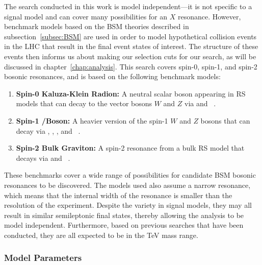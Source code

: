 The search conducted in this work is model independent---it is not specific to a signal model and can cover many possibilities for an $X$ resonance.
However, benchmark models based on the BSM theories described in subsection~\ref{subsec:BSM} are used in order to model hypothetical collision events in the LHC that result in the final event states of interest.
The structure of these events then informs us about making our selection cuts for our search, as will be discussed in chapter~\ref{chap:analysis}.
This search covers spin-0, spin-1, and spin-2 bosonic resonances, and is based on the following benchmark models:
\begin{enumerate}
  \item \textbf{Spin-0 Kaluza-Klein Radion:} A neutral scalar boson appearing in RS models that can decay to the vector bosons $W$ and $Z$ via \RadtoWW and \RadtoZZ~\cite{Goldberger_1999,Goldberger_2000}.
  \item \textbf{Spin-1 \Wpr/\Zpr Boson:} A heavier version of the spin-1 $W$ and $Z$ bosons that can decay via \WprtoWZ, \WprtoWH, \ZprtoWW, and \ZprtoZH~\cite{Pappadopulo_2014}.
  \item \textbf{Spin-2 Bulk Graviton:} A spin-2 resonance from a bulk RS model that decays via \GBulktoWW and \GBulktoZZ~\cite{Fitzpatrick_2007,PhysRevD.76.036006}.
\end{enumerate}

These benchmarks cover a wide range of possibilities for candidate BSM bosonic resonances to be discovered.
The models used also assume a narrow resonance, which means that the internal width of the resonance is smaller than the resolution of the experiment.
Despite the variety in signal models, they may all result in similar semileptonic final states, thereby allowing the analysis to be model independent.
Furthermore, based on previous searches that have been conducted, they are all expected to be in the TeV mass range.

\subsubsection{Model Parameters}
\label{subsec:param}

